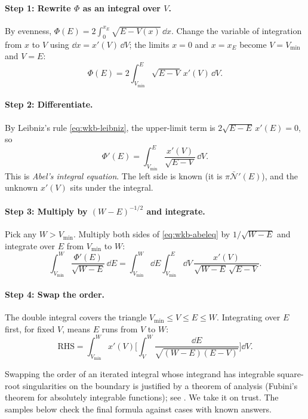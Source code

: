 \paragraph{Step 1: Rewrite $\Phi$ as an integral over $V$.} By evenness, $\Phi(E)=2\int_0^{x_E}\sqrt{E-V(x)}\,\dd x$. Change the variable of integration from $x$ to $V$ using $\dd x=x'(V)\,\dd V$; the limits $x=0$ and $x=x_E$ become $V=V_{\min}$ and $V=E$:
\begin{equation}
\Phi(E)=2\int_{V_{\min}}^{E}\sqrt{E-V}\,x'(V)\,\dd V .
\end{equation}

\paragraph{Step 2: Differentiate.} By Leibniz's rule \cref{eq:wkb-leibniz}, the upper-limit term is $2\sqrt{E-E}\,x'(E)=0$, so
\begin{equation}
\Phi'(E)=\int_{V_{\min}}^{E}\frac{x'(V)}{\sqrt{E-V}}\,\dd V .
\label{eq:wkb-abeleq}
\end{equation}
This is \emph{Abel's integral equation}. The left side is known (it is $\pi\bar{\mathcal N}'(E)$), and the unknown $x'(V)$ sits under the integral.

\paragraph{Step 3: Multiply by $(W-E)^{-1/2}$ and integrate.} Pick any $W>V_{\min}$. Multiply both sides of \cref{eq:wkb-abeleq} by $1/\sqrt{W-E}$ and integrate over $E$ from $V_{\min}$ to $W$:
\begin{equation}
\int_{V_{\min}}^{W}\frac{\Phi'(E)}{\sqrt{W-E}}\,\dd E=\int_{V_{\min}}^{W}\dd E\int_{V_{\min}}^{E}\dd V\,\frac{x'(V)}{\sqrt{W-E}\,\sqrt{E-V}} .
\end{equation}

\paragraph{Step 4: Swap the order.} The double integral covers the triangle $V_{\min}\le V\le E\le W$. Integrating over $E$ first, for fixed $V$, means $E$ runs from $V$ to $W$:
\begin{equation}
\text{RHS}=\int_{V_{\min}}^{W}x'(V)\Biggl[\int_V^W\frac{\dd E}{\sqrt{(W-E)(E-V)}}\Biggr]\dd V .
\end{equation}

\begin{beyond}
Swapping the order of an iterated integral whose integrand has integrable square-root singularities on the boundary is justified by a theorem of analysis (Fubini's theorem for absolutely integrable functions); see \cite{rhb}. We take it on trust. The samples below check the final formula against cases with known answers.
\end{beyond}

